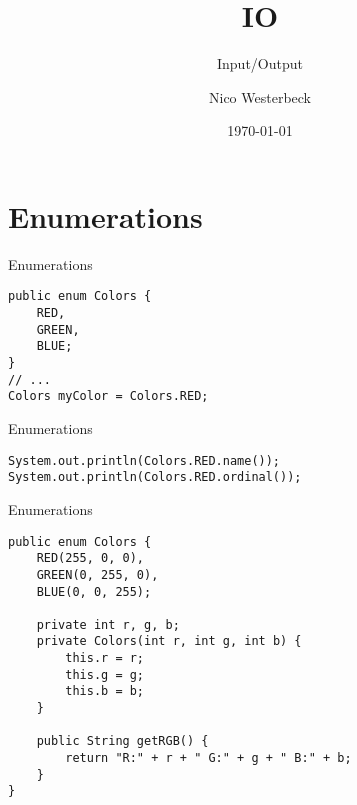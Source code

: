 
\usepackage{multicol}

\title{IO}
\subtitle{Input/Output}
\author{Nico Westerbeck}
\date{\today}




\titlepage

\section{Enumerations}
\begin{frame}[fragile]{Enumerations}
\begin{lstlisting}
public enum Colors {
	RED,
	GREEN,
	BLUE;
}
// ...
Colors myColor = Colors.RED;
\end{lstlisting}
\end{frame}

\begin{frame}[fragile]{Enumerations}
\begin{lstlisting}
System.out.println(Colors.RED.name());
System.out.println(Colors.RED.ordinal());
\end{lstlisting}
\end{frame}

\begin{frame}[fragile]{Enumerations}
\begin{lstlisting}
public enum Colors {
	RED(255, 0, 0),
	GREEN(0, 255, 0),
	BLUE(0, 0, 255);
	
	private int r, g, b;
	private Colors(int r, int g, int b) {
		this.r = r;
		this.g = g;
		this.b = b;
	}
	
	public String getRGB() {
		return "R:" + r + " G:" + g + " B:" + b;
	}
}
\end{lstlisting}
\end{frame}

